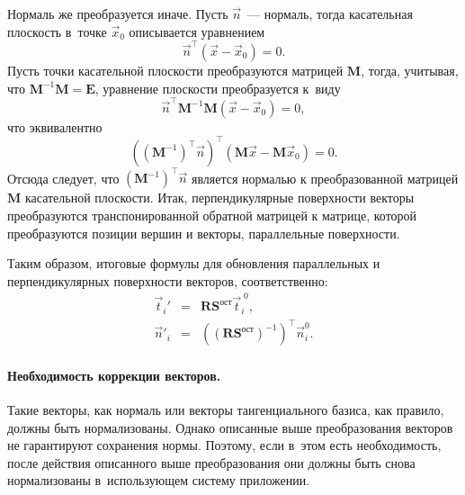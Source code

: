 \documentclass[a4paper, 14pt, titlepage]{extarticle}
\newcommand{\vect}[1]{\vec{#1}} %
\newcommand{\matx}[1]{\mathbf{#1}} %
\newcommand{\transposed}{\top} %
\begin{document}
        Нормаль же преобразуется иначе. Пусть $\vect n$~---
        нормаль, тогда касательная плоскость в~точке $\vect{x}_0$ описывается уравнением
        \[
        \vect{n}^\transposed (\vect x - \vect{x}_0) = 0.
        \]
        Пусть точки касательной плоскости преобразуются матрицей $\matx M$, тогда, учитывая, что
        $\matx{M}^{-1} \matx{M} = \matx{E}$, уравнение плоскости преобразуется к~виду
        \[
          \vect{n}^\transposed \matx{M}^{-1} \matx{M} (\vect x - \vect{x}_0) = 0,
        \]
        что эквивалентно
        \[
           \left( (\matx{M}^{-1})^\transposed \vect{n} \right)^\transposed (\matx{M} \vect x - \matx{M} \vect{x}_0) = 0.
        \]
        Отсюда следует, что $(\matx{M}^{-1})^\transposed \vect{n}$ является нормалью к преобразованной
        матрицей $\matx M$ касательной плоскости. Итак, перпендикулярные поверхности векторы
        преобразуются транспонированной обратной матрицей к матрице, которой преобразуются позиции
        вершин и векторы, параллельные поверхности.

        Таким образом, итоговые формулы для обновления параллельных и перпендикулярных поверхности
        векторов, соответственно:
        \begin{eqnarray}
          \vect{t}_i\!' & = & \matx{R} \matx{S}^{ост} \vect{t}^{\;0}_i, \label{eq:tangent_vectors} \\
          \vect{n}'_i & = & \left(\left(\matx{R} \matx{S}^{ост}\right)^{-1}\right)^\transposed \vect{n}^0_i. \label{eq:normal_vectors}
        \end{eqnarray}

        \paragraph{Необходимость коррекции векторов.}
        Такие векторы, как нормаль или векторы тангенциального базиса, как правило, должны быть
        нормализованы. Однако описанные выше преобразования векторов не гарантируют сохранения
        нормы. Поэтому, если в~этом есть необходимость, после действия описанного выше преобразования
        они должны быть снова нормализованы в~использующем систему приложении.
\end{document}
